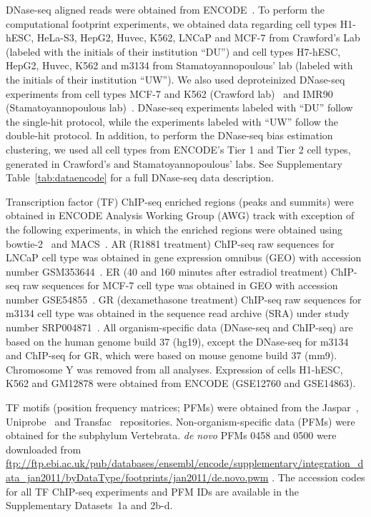 \documentclass[11pt]{article}
\begin{document}
DNase-seq aligned reads were obtained from ENCODE~\citep{encode2012}. To perform the computational footprint experiments, we obtained data regarding cell types H1-hESC, HeLa-S3, HepG2, Huvec, K562, LNCaP and MCF-7 from Crawford's Lab (labeled with the initials of their institution ``DU'') and cell types H7-hESC, HepG2, Huvec, K562 and m3134 from Stamatoyannopoulous' lab (labeled with the initials of their institution ``UW''). We also used deproteinized DNase-seq experiments from cell types MCF-7 and K562 (Crawford lab)~\citep{yardimci2014} and IMR90 (Stamatoyannopoulous lab)~\citep{lazarovici2013}. DNase-seq experiments labeled with ``DU'' follow the single-hit protocol, while the experiments labeled with ``UW'' follow the double-hit protocol. In addition, to perform the DNase-seq bias estimation clustering, we used all cell types from ENCODE's Tier 1 and Tier 2 cell types, generated in Crawford's and Stamatoyannopoulous' labs. See Supplementary Table~\ref{tab:dataencode} for a full DNase-seq data description.

Transcription factor (TF) ChIP-seq enriched regions (peaks and summits) were obtained in ENCODE Analysis Working Group (AWG) track with exception of the following experiments, in which the enriched regions were obtained using bowtie-2~\citep{langmead2012} and MACS~\citep{zhang2008}. AR (R1881 treatment) ChIP-seq raw sequences for LNCaP cell type was obtained in gene expression omnibus (GEO) with accession number GSM353644~\citep{yu2010}. ER (40 and 160 minutes after estradiol treatment) ChIP-seq raw sequences for MCF-7 cell type was obtained in GEO with accession number GSE54855~\citep{guertin2014}. GR (dexamethasone treatment) ChIP-seq raw sequences for m3134 cell type was obtained in the sequence read archive (SRA) under study number SRP004871~\citep{john2011}. All organism-specific data (DNase-seq and ChIP-seq) are based on the human genome build 37 (hg19), except the DNase-seq for m3134 and ChIP-seq for GR, which were based on mouse genome build 37 (mm9). Chromosome Y was removed from all analyses. Expression of cells H1-hESC, K562 and GM12878 were obtained from ENCODE (GSE12760 and GSE14863). 

TF motifs (position frequency matrices; PFMs) were obtained from the Jaspar~\citep{mathelier2014}, Uniprobe~\citep{robasky2011} and Transfac~\citep{matys2006} repositories. Non-organism-specific data (PFMs) were obtained for the subphylum Vertebrata. \emph{de novo} PFMs 0458 and 0500 were downloaded from \url{ftp://ftp.ebi.ac.uk/pub/databases/ensembl/encode/supplementary/integration_data_jan2011/byDataType/footprints/jan2011/de.novo.pwm} \citep{neph2012a}. The accession codes for all TF ChIP-seq experiments and PFM IDs are available in the Supplementary Datasets~1a and 2b-d.
\end{document}
